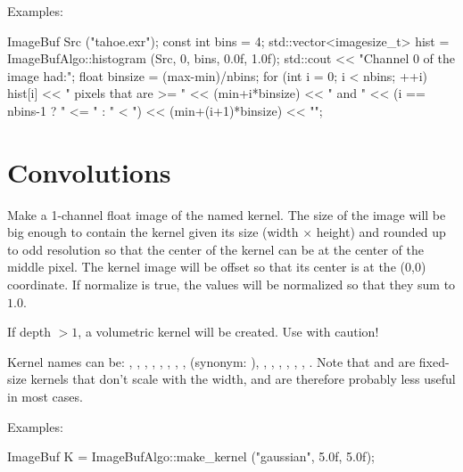\smallskip
\noindent Examples:
\begin{code}
    ImageBuf Src ("tahoe.exr");
    const int bins = 4;
    std::vector<imagesize_t> hist =
        ImageBufAlgo::histogram (Src, 0, bins, 0.0f, 1.0f);
    std::cout << "Channel 0 of the image had:\n";
    float binsize = (max-min)/nbins;
    for (int i = 0;  i < nbins;  ++i)
        hist[i] << " pixels that are >= " << (min+i*binsize) << " and "
                << (i == nbins-1 ? " <= " : " < ")
                << (min+(i+1)*binsize) << "\n";
\end{code}
\apiend




\section{Convolutions}
\label{sec:iba:convolutions}

 
Make a 1-channel {\cf float} image of the named kernel.
The size of the image will be big enough to contain the kernel
given its size ({\cf width} $\times$ {\cf height})
and rounded up to odd resolution so
that the center of the kernel can be at the center of the middle
pixel.  The kernel image will be offset so that its center is at the
{\cf (0,0)} coordinate.  If {\cf normalize} is true, the values will be
normalized so that they sum to $1.0$.

If {\cf depth} $> 1$, a volumetric kernel will be created.  Use with
caution!

Kernel names can be: , , ,
, , , ,
,  (synonym: ),
, , ,
, , , . Note that
 and  are fixed-size kernels that don't
scale with the width, and are therefore probably less useful in most
cases.

\smallskip
\noindent Examples:
\begin{code}
    ImageBuf K = ImageBufAlgo::make_kernel ("gaussian", 5.0f, 5.0f);
\end{code}
\apiend


